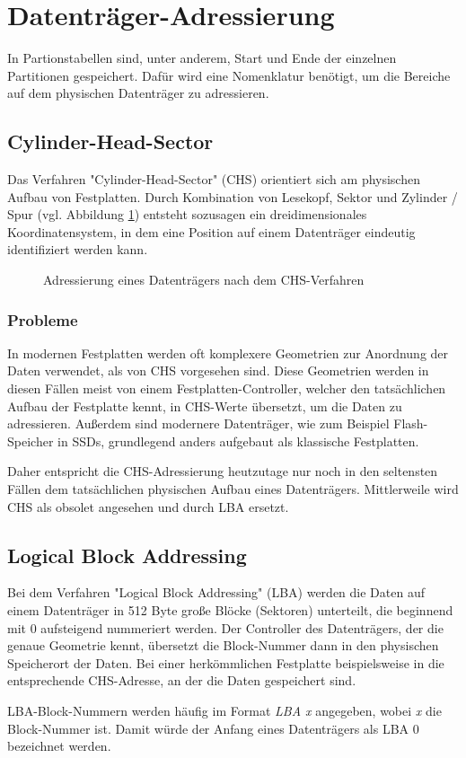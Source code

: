\section{Datenträger-Adressierung}
\label{sec:addressing}
In Partionstabellen sind, unter anderem, Start und Ende der einzelnen Partitionen gespeichert.
Dafür wird eine Nomenklatur benötigt, um die Bereiche auf dem physischen Datenträger zu adressieren.

\subsection{Cylinder-Head-Sector}
Das Verfahren "Cylinder-Head-Sector" (CHS) orientiert sich am physischen Aufbau von Festplatten.
Durch Kombination von Lesekopf, Sektor und Zylinder / Spur (vgl. Abbildung \ref{fig:chs}) entsteht sozusagen ein dreidimensionales Koordinatensystem, in dem eine Position auf einem Datenträger eindeutig identifiziert werden kann.

\begin{figure}[ht]
    \centering
    \fbox{}
    \caption{Adressierung eines Datenträgers nach dem CHS-Verfahren}
    \label{fig:chs}
\end{figure}

\subsubsection{Probleme}
In modernen Festplatten werden oft komplexere Geometrien zur Anordnung der Daten verwendet, als von CHS vorgesehen sind.
Diese Geometrien werden in diesen Fällen meist von einem Festplatten-Controller, welcher den tatsächlichen Aufbau der Festplatte kennt, in CHS-Werte übersetzt, um die Daten zu adressieren.\cite{pollard2011}
Außerdem sind modernere Datenträger, wie zum Beispiel Flash-Speicher in SSDs, grundlegend anders aufgebaut als klassische Festplatten.

Daher entspricht die CHS-Adressierung heutzutage nur noch in den seltensten Fällen dem tatsächlichen physischen Aufbau eines Datenträgers. 
Mittlerweile wird CHS als obsolet angesehen und durch LBA ersetzt.


\subsection{Logical Block Addressing}
\label{sec:addressing:lba}
Bei dem Verfahren "Logical Block Addressing" (LBA) werden die Daten auf einem Datenträger in 512 Byte große Blöcke (Sektoren) unterteilt, die beginnend mit 0 aufsteigend nummeriert werden.
Der Controller des Datenträgers, der die genaue Geometrie kennt, übersetzt die Block-Nummer dann in den physischen Speicherort der Daten.
Bei einer herkömmlichen Festplatte beispielsweise in die entsprechende CHS-Adresse, an der die Daten gespeichert sind.

LBA-Block-Nummern werden häufig im Format \textit{LBA x} angegeben, wobei \textit{x} die Block-Nummer ist.
Damit würde der Anfang eines Datenträgers als LBA 0 bezeichnet werden.
